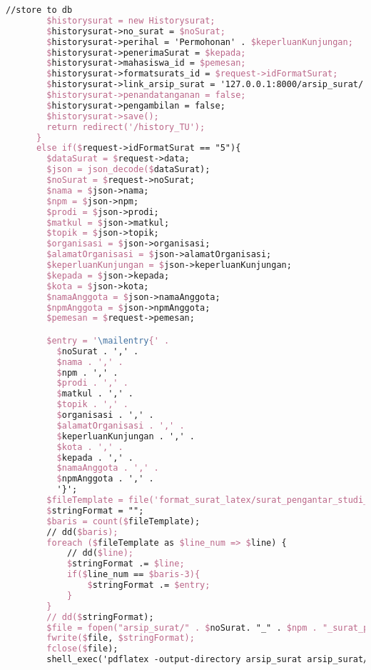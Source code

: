 \begin{lstlisting}[language=tex,basicstyle=\tiny,caption=HistorysuratController.php]
        //store to db
        $historysurat = new Historysurat;
        $historysurat->no_surat = $noSurat;
        $historysurat->perihal = 'Permohonan' . $keperluanKunjungan;
        $historysurat->penerimaSurat = $kepada;
        $historysurat->mahasiswa_id = $pemesan;
        $historysurat->formatsurats_id = $request->idFormatSurat;
        $historysurat->link_arsip_surat = '127.0.0.1:8000/arsip_surat/' . $noSurat. '_' . $npm . '_surat_pengantar_studi_lapangan_1orang.pdf';
        $historysurat->penandatanganan = false;
        $historysurat->pengambilan = false;
        $historysurat->save();
        return redirect('/history_TU');
      }
      else if($request->idFormatSurat == "5"){
        $dataSurat = $request->data;
        $json = json_decode($dataSurat);
        $noSurat = $request->noSurat;
        $nama = $json->nama;
        $npm = $json->npm;
        $prodi = $json->prodi;
        $matkul = $json->matkul;
        $topik = $json->topik;
        $organisasi = $json->organisasi;
        $alamatOrganisasi = $json->alamatOrganisasi;
        $keperluanKunjungan = $json->keperluanKunjungan;
        $kepada = $json->kepada;
        $kota = $json->kota;
        $namaAnggota = $json->namaAnggota;
        $npmAnggota = $json->npmAnggota;
        $pemesan = $request->pemesan;

        $entry = '\mailentry{' .
          $noSurat . ',' .
          $nama . ',' .
          $npm . ',' .
          $prodi . ',' .
          $matkul . ',' .
          $topik . ',' .
          $organisasi . ',' .
          $alamatOrganisasi . ',' .
          $keperluanKunjungan . ',' .
          $kota . ',' .
          $kepada . ',' .
          $namaAnggota . ',' .
          $npmAnggota . ',' .
          '}';
        $fileTemplate = file('format_surat_latex/surat_pengantar_studi_lapangan_2orang.tex');
        $stringFormat = "";
        $baris = count($fileTemplate);
        // dd($baris);
        foreach ($fileTemplate as $line_num => $line) {
            // dd($line);
            $stringFormat .= $line;
            if($line_num == $baris-3){
                $stringFormat .= $entry;
            }
        }
        // dd($stringFormat);
        $file = fopen("arsip_surat/" . $noSurat. "_" . $npm . "_surat_pengantar_studi_lapangan_2orang.tex", "w");
        fwrite($file, $stringFormat);
        fclose($file);
        shell_exec('pdflatex -output-directory arsip_surat arsip_surat/' . $noSurat . '_' . $npm . '_surat_pengantar_studi_lapangan_2orang.tex');


\end{lstlisting}
